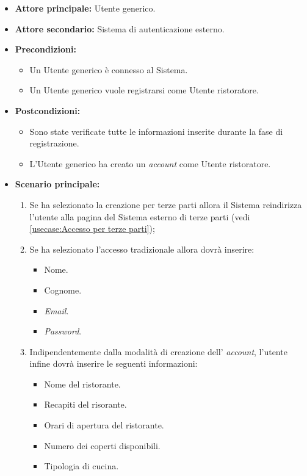 \label{usecase:Registrazione Utente ristoratore}
\begin{itemize}

	\item \textbf{Attore principale:} Utente generico.
	\item \textbf{Attore secondario:} Sistema di autenticazione esterno. 

	\item \textbf{Precondizioni:} 
	\begin{itemize}
        \item  Un Utente generico è connesso al Sistema.
        \item  Un Utente generico vuole registrarsi come Utente ristoratore.
    \end{itemize}
    

	\item \textbf{Postcondizioni:} 
    \begin{itemize}
        \item  Sono state verificate tutte le informazioni inserite durante la fase di registrazione.
        \item  L'Utente generico ha creato un \textit{account} come Utente ristoratore.
    \end{itemize}

	\item \textbf{Scenario principale:}
	\begin{enumerate}

            \item Se ha selezionato la creazione per terze parti allora il Sistema reindirizza l'utente alla pagina del Sistema esterno di terze parti (vedi \autoref{usecase:Accesso per terze parti});
            \item Se ha selezionato l'accesso tradizionale allora dovrà inserire:
            \begin{itemize}
                \item Nome.
                \item Cognome.
                \item \textit{Email}.
                \item \textit{Password}.
            \end{itemize}

            \item Indipendentemente dalla modalità di creazione dell' \textit{account}, l'utente infine dovrà inserire le seguenti informazioni:
                \begin{itemize}
                    \item Nome del ristorante.
                    \item Recapiti del risorante.
                    \item Orari di apertura del ristorante.
                    \item Numero dei coperti disponibili.
                    \item Tipologia di cucina.
                \end{itemize}
            
	\end{enumerate}
	
\end{itemize}